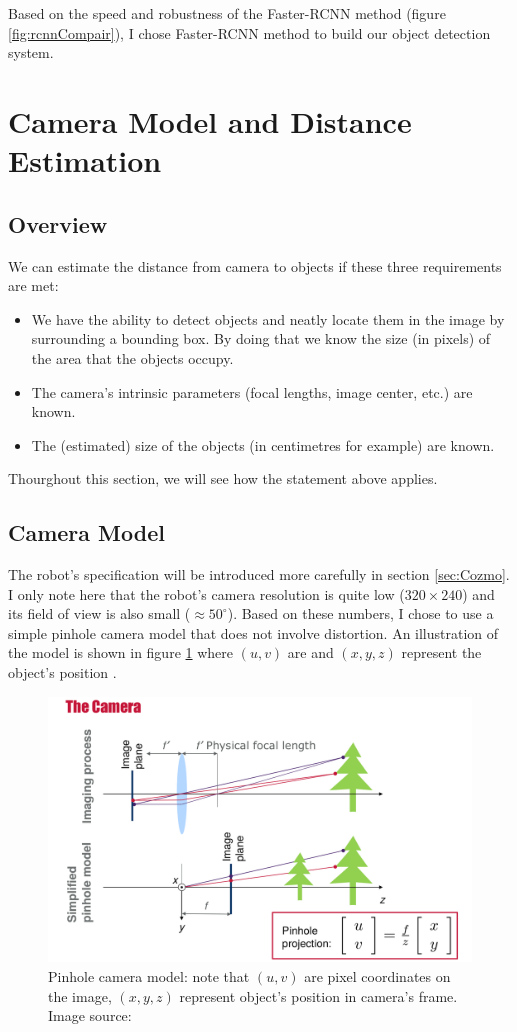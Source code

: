 Based on the speed and robustness of the Faster-RCNN method (figure \ref{fig:rcnnCompair}), I chose Faster-RCNN method to build our object detection system.


\section{Camera Model and Distance Estimation}
\label{sec:camModel}
\subsection{Overview}
We can estimate the distance from camera to objects if these three requirements are met: 
\begin{itemize}
	\item We have the ability to detect objects and neatly locate them in the image by surrounding a bounding box. By doing that we know the size (in pixels) of the area that the objects occupy.
	\item The camera's intrinsic parameters (focal lengths, image center, etc.) are known.
	\item The (estimated) size of the objects (in centimetres for example) are known.
\end{itemize}
Thourghout this section, we will see how the statement above applies. 

\subsection{Camera Model}
The robot's specification will be introduced more carefully in section \ref{sec:Cozmo}. I only note here that the robot's camera resolution is quite low ($320 \times 240$) and its field of view is also small ($\approx 50 ^{\circ}$). Based on these numbers, I chose to use a simple pinhole camera model that does not involve distortion. An illustration of the model is shown in figure \ref{fig:pinhole} where $(u, v)$ are  and $(x,y,z)$ represent the object's position .

\begin{figure}[tb]
	\centering
	\includegraphics[width=0.9\hsize]{./figures/pinhole}
	\caption{Pinhole camera model: note that $(u, v)$ are pixel coordinates on the image, $(x,y,z)$ represent object's position in camera's frame. Image source: \cite{c433}}
	\label{fig:pinhole}
\end{figure}


